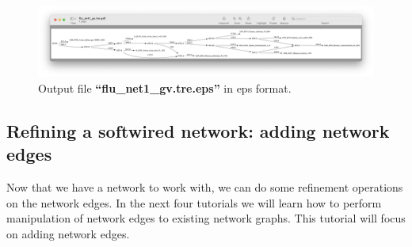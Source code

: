 \documentclass[11pt]{article}
\begin{document}
\begin{enumerate}
\begin{figure}[H]
\centering
\includegraphics[width=\textwidth]{eps1.png}
\caption{Output file \textbf{``flu\_net1\_gv.tre.eps''} in eps format.}
\label{eps1}
\end{figure}

\end{enumerate}
\subsection{Refining a softwired network: adding network edges}
\label{subsec:netadd}

Now that we have a network to work with, we can do some refinement operations 
on the network edges. In the next four tutorials we will learn how to perform 
manipulation of network edges to existing network graphs. This tutorial will 
focus on adding network edges.
\end{document}
